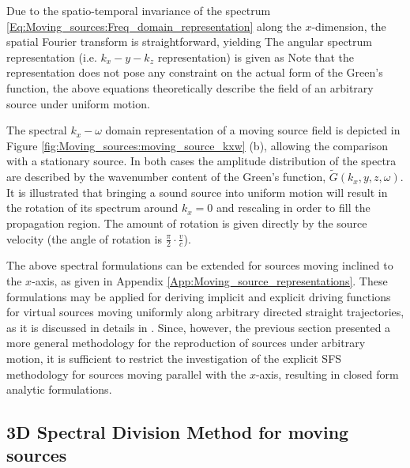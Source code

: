 \vspace{3mm}
Due to the spatio-temporal invariance of the spectrum \eqref{Eq:Moving_sources:Freq_domain_representation} along the $x$-dimension, the spatial Fourier transform is straightforward, yielding
The angular spectrum representation (i.e. $k_x-y-k_z$ representation) is given as
Note that the representation does not pose any constraint on the actual form of the Green's function, the above equations theoretically describe the field of an arbitrary source under uniform motion.	

The spectral $k_x-\omega$ domain representation of a moving source field is depicted in Figure \ref{fig:Moving_sources:moving_source_kxw} (b), allowing the comparison with  a stationary source.
In both cases the amplitude distribution of the spectra are described by the wavenumber content of the Green's function, $\tilde{G}(k_x,y,z,\omega)$.
It is illustrated that bringing a sound source into uniform motion will result in the rotation of its spectrum around $k_x = 0$ and rescaling in order to fill the propagation region.
The amount of rotation is given directly by the source velocity (the angle of rotation is $\frac{\pi}{2} \cdot \frac{v}{c}$).

The above spectral formulations can be extended for sources moving inclined to the $x$-axis, as given in Appendix \ref{App:Moving_source_representations}.
These formulations may be applied for deriving implicit and explicit driving functions for virtual sources moving uniformly along arbitrary directed straight trajectories, as it is discussed in details in \cite{firtha2015sound}.
Since, however, the previous section presented a more general methodology for the reproduction of sources under arbitrary motion, it is sufficient to restrict the investigation of the explicit SFS methodology for sources moving parallel with the $x$-axis, resulting in closed form analytic formulations.

\subsection{3D Spectral Division Method for moving sources}

